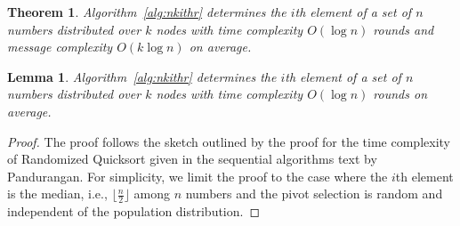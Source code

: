 \documentclass[11pt,epsf]{article}
\newtheorem{theorem}{Theorem}
\newtheorem{lemma}{Lemma}
\begin{document}
{{{\begin{algorithm}
\begin{algorithmic}
{            
            \ENDIF
            \ENDIF
          }\ENDWHILE
        \end{algorithmic}
      \end{algorithm}
    }
    \begin{theorem}
      \label{thm:nkithr}
      Algorithm~\ref{alg:nkithr} determines the $i$th element of a set of $n$ numbers
      distributed over $k$ nodes with time complexity $O(\log n)$ rounds and message complexity
      $O(k \log n)$ on average.
    \end{theorem}
    \begin{lemma}
      \label{lem:nkithr-t}
      Algorithm~\ref{alg:nkithr} determines the $i$th element of a set of $n$ numbers
      distributed over $k$ nodes with time complexity $O(\log n)$ rounds on average.
    \end{lemma}
    \begin{proof}
      The proof follows the sketch outlined by the proof for the time
      complexity of Randomized Quicksort given in the sequential algorithms
      text by Pandurangan\autocite[168]{ALG}. For simplicity, we limit the proof to the
      case where the $i$th element is the median, i.e., $\lfloor \frac{n}{2} \rfloor$
      among $n$ numbers and the pivot selection is random and independent of the
      population distribution.

\end{proof}}}
\end{document}
